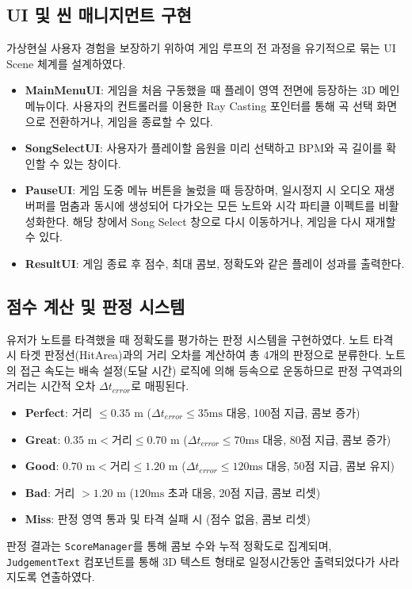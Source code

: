 \documentclass{kcc}
\begin{document}
\subsection{UI 및 씬 매니지먼트 구현}
가상현실 사용자 경험을 보장하기 위하여 게임 루프의 전 과정을 유기적으로 묶는 UI Scene 체계를 설계하였다.
\begin{itemize}[itemsep=0pt,parsep=0pt]
  \item \textbf{MainMenuUI}: 게임을 처음 구동했을 때 플레이 영역 전면에 등장하는 3D 메인 메뉴이다. 사용자의 컨트롤러를 이용한 Ray Casting 포인터를 통해 곡 선택 화면으로 전환하거나, 게임을 종료할 수 있다.
  \item \textbf{SongSelectUI}: 사용자가 플레이할 음원을 미리 선택하고 BPM와 곡 길이를 확인할 수 있는 창이다.
  \item \textbf{PauseUI}: 게임 도중 메뉴 버튼을 눌렀을 때 등장하며, 일시정지 시 오디오 재생 버퍼를 멈춤과 동시에 생성되어 다가오는 모든 노트와 시각 파티클 이펙트를 
비활성화한다. 해당 창에서 Song Select 창으로 다시 이동하거나, 게임을 다시 재개할 수 있다.
  \item \textbf{ResultUI}: 게임 종료 후 점수, 최대 콤보, 정확도와 같은 플레이 성과를 출력한다.
\end{itemize}

\subsection{점수 계산 및 판정 시스템}
유저가 노트를 타격했을 때 정확도를 평가하는 판정 시스템을 구현하였다.
노트 타격 시 타겟 판정선(HitArea)과의 거리 오차를 계산하여 총 4개의 판정으로 분류한다. 노트의 접근 속도는 배속 설정(도달 시간) 로직에 의해 등속으로 운동하므로 판정 구역과의 거리는 시간적 오차 $\Delta t_{error}$로 매핑된다.
\begin{itemize}[itemsep=0pt,parsep=0pt]
  \item \textbf{Perfect}: 거리 $\le 0.35\text{ m}$ ($\Delta t_{error} \le 35\text{ms}$ 대응, 100점 지급, 콤보 증가)
  \item \textbf{Great}: $0.35\text{ m} < \text{거리} \le 0.70\text{ m}$ ($\Delta t_{error} \le 70\text{ms}$ 대응, 80점 지급, 콤보 증가)
  \item \textbf{Good}: $0.70\text{ m} < \text{거리} \le 1.20\text{ m}$ ($\Delta t_{error} \le 120\text{ms}$ 대응, 50점 지급, 콤보 유지)
  \item \textbf{Bad}: 거리 $> 1.20\text{ m}$ ($120\text{ms}$ 초과 대응, 20점 지급, 콤보 리셋)
  \item \textbf{Miss}: 판정 영역 통과 및 타격 실패 시 (점수 없음, 콤보 리셋)
\end{itemize}
판정 결과는 \texttt{ScoreManager}를 통해 콤보 수와 누적 정확도로 집계되며, \texttt{JudgementText} 컴포넌트를 통해 3D 텍스트 형태로 일정시간동안 출력되었다가 사라지도록 연출하였다.
\end{document}
